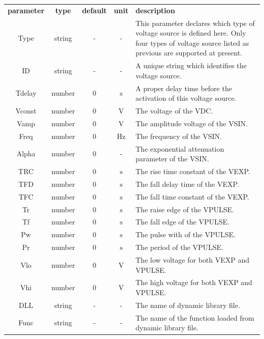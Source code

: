 \documentclass[11pt,pdftex]{article}
\begin{document}
\small
\noindent\begin{longtable}{ccccp{7cm}}
\textbf{parameter}   & \textbf{type}  & \textbf{default} & \textbf{unit} & \textbf{description} \\
Type   & string  & -  & -             & This parameter declares which type of
                                        voltage source is defined here.
                                        Only four types of voltage source listed as previous are supported at present. \\
ID     & string  & -  & -             & A unique string which identifies the voltage source.\\
Tdelay & number  & 0  & $\mathrm{s}$  & A proper delay time before the activation of this voltage source. \\
Vconst & number  & 0  & $\mathrm{V}$  & The voltage of the VDC. \\
Vamp   & number  & 0  & $\mathrm{V}$  & The amplitude voltage of the VSIN. \\
Freq   & number  & 0  & $\mathrm{Hz}$ & The frequency of the VSIN. \\
Alpha  & number  & 0  & -             & The exponential attenuation parameter of the VSIN. \\
TRC    & number  & 0  & $\mathrm{s}$  & The rise time constant of the VEXP. \\
TFD    & number  & 0  & $\mathrm{s}$  & The fall delay time of the VEXP. \\
TFC    & number  & 0  & $\mathrm{s}$  & The fall time constant of the VEXP. \\
Tr     & number  & 0  & $\mathrm{s}$  & The raise edge of the VPULSE. \\
Tf     & number  & 0  & $\mathrm{s}$  & The fall edge of the VPULSE. \\
Pw     & number  & 0  & $\mathrm{s}$  & The pulse with of the VPULSE. \\
Pr     & number  & 0  & $\mathrm{s}$  & The period of the VPULSE. \\
Vlo    & number  & 0  & $\mathrm{V}$  & The low voltage for both VEXP and VPULSE. \\
Vhi    & number  & 0  & $\mathrm{V}$  & The high voltage for both VEXP and VPULSE. \\
DLL    & string  & -  & -             & The name of dynamic library file.\\
Func   & string  & -  & -             & The name of the function loaded from dynamic library file.
\end{longtable}
\normalsize
\end{document}
